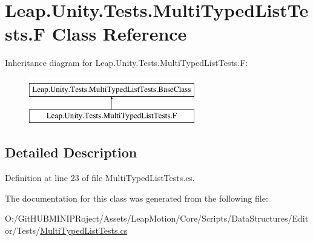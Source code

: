 \hypertarget{class_leap_1_1_unity_1_1_tests_1_1_multi_typed_list_tests_1_1_f}{}\section{Leap.\+Unity.\+Tests.\+Multi\+Typed\+List\+Tests.\+F Class Reference}
\label{class_leap_1_1_unity_1_1_tests_1_1_multi_typed_list_tests_1_1_f}
Inheritance diagram for Leap.\+Unity.\+Tests.\+Multi\+Typed\+List\+Tests.\+F\+:\begin{figure}[H]
\begin{center}
\leavevmode
\includegraphics[height=2.000000cm]{class_leap_1_1_unity_1_1_tests_1_1_multi_typed_list_tests_1_1_f}
\end{center}
\end{figure}


\subsection{Detailed Description}


Definition at line 23 of file Multi\+Typed\+List\+Tests.\+cs.



The documentation for this class was generated from the following file\+:\begin{DoxyCompactItemize}
\item 
O\+:/\+Git\+H\+U\+B\+M\+I\+N\+I\+P\+Roject/\+Assets/\+Leap\+Motion/\+Core/\+Scripts/\+Data\+Structures/\+Editor/\+Tests/\mbox{\hyperlink{_multi_typed_list_tests_8cs}{Multi\+Typed\+List\+Tests.\+cs}}\end{DoxyCompactItemize}

